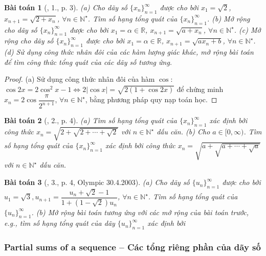\documentclass{article}
\newtheorem{baitoan}{Bài toán}
\begin{document}
\begin{baitoan}[\cite{Chung_day_so}, 1., p. 3]
	(a) Cho dãy số $\{x_n\}_{n=1}^\infty$ được cho bởi $x_1 = \sqrt{2}$, $x_{n+1} = \sqrt{2 + x_n}$, $\forall n\in\mathbb{N}^\star$. Tìm số hạng tổng quát của $\{x_n\}_{n=1}^\infty$. (b) Mở rộng cho dãy số $\{x_n\}_{n=1}^\infty$ được cho bởi $x_1 = \alpha\in\mathbb{R}$, $x_{n+1} = \sqrt{a + x_n}$, $\forall n\in\mathbb{N}^\star$. (c) Mở rộng cho dãy số $\{x_n\}_{n=1}^\infty$ được cho bởi $x_1 = \alpha\in\mathbb{R}$, $x_{n+1} = \sqrt{ax_n + b}$, $\forall n\in\mathbb{N}^\star$. (d) Sử dụng công thức nhân đôi của các hàm lượng giác khác, mở rộng bài toán để tìm công thức tổng quát của các dãy số tương ứng.
\end{baitoan}

\begin{proof}
	(a) Sử dụng công thức nhân đôi của hàm $\cos$: $\cos2x = 2\cos^2x - 1\Leftrightarrow2|\cos x| = \sqrt{2(1 + \cos2x)}$ để chứng minh $x_n = 2\cos\dfrac{\pi}{2^{n+1}}$, $\forall n\in\mathbb{N}^\star$, bằng phương pháp quy nạp toán học.
\end{proof}

\begin{baitoan}[\cite{Chung_day_so}, 2., p. 4]
	(a) Tìm số hạng tổng quát của $\{x_n\}_{n=1}^\infty$ xác định bởi công thức $x_n = \sqrt{2 + \sqrt{2 + \cdots + \sqrt{2}}}$ với $n\in\mathbb{N}^\star$ dấu căn. (b) Cho $a\in[0,\infty)$. Tìm số hạng tổng quát của $\{x_n\}_{n=1}^\infty$ xác định bởi công thức $x_n = \sqrt{a + \sqrt{a + \cdots + \sqrt{a}}}$ với $n\in\mathbb{N}^\star$ dấu căn.
\end{baitoan}

\begin{baitoan}[\cite{Chung_day_so}, 3., p. 4, Olympic 30.4.2003]
	(a) Cho dãy số $\{u_n\}_{n=1}^\infty$ được cho bởi $u_1 = \sqrt{3},u_{n+1} = \dfrac{u_n + \sqrt{2} - 1}{1 + (1 - \sqrt{2})u_n}$, $\forall n\in\mathbb{N}^\star$. Tìm số hạng tổng quát của $\{u_n\}_{n=1}^\infty$. (b) Mở rộng bài toán tương ứng với các mở rộng của bài toán trước, e.g., tìm số hạng tổng quát của dãy $\{u_n\}_{n=1}^\infty$ xác định bởi 
\end{baitoan}


\subsubsection{Partial sums of a sequence -- Các tổng riêng phần của dãy số}
\end{document}
